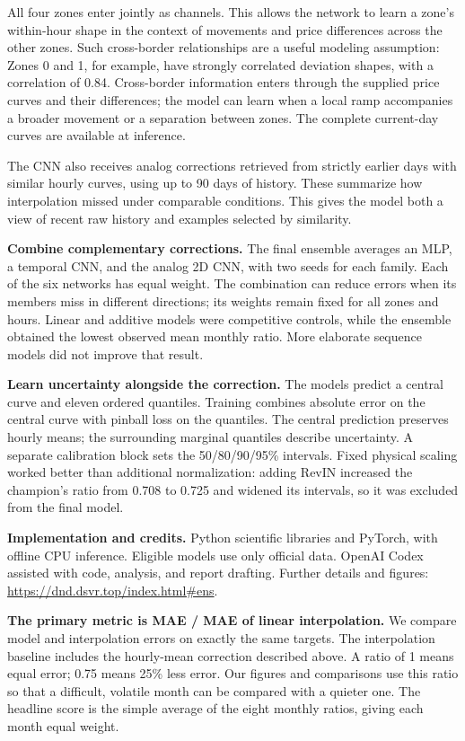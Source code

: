 \documentclass[11pt,a4paper]{article}
\newcommand{\reportsection}[2]{\vspace{5pt}{\large\bfseries\color{ink}#1\enspace #2}\par\vspace{2pt}}
\newcommand{\runin}[1]{\textbf{#1}\enspace}
\begin{document}
All four zones enter jointly as channels. This allows the network to learn
a zone's within-hour shape in the context of movements and price differences
across the other zones. Such cross-border relationships are a useful modeling
assumption: Zones 0 and 1, for example, have strongly correlated deviation
shapes, with a correlation of 0.84. Cross-border information enters through
the supplied price curves and their differences; the model can learn when
a local ramp accompanies a broader movement or a separation between zones.
The complete current-day curves are available at inference.

The CNN also receives analog corrections retrieved from strictly earlier
days with similar hourly curves, using up to 90 days of history. These summarize
how interpolation missed under comparable conditions. This gives the model
both a view of recent raw history and examples selected by similarity.

\runin{Combine complementary corrections.}
The final ensemble averages an MLP, a temporal CNN, and the analog 2D CNN,
with two seeds for each family. Each of the six networks has equal weight.
The combination can reduce errors when its members miss in different directions;
its weights remain fixed for all zones and hours. Linear and additive models
were competitive controls, while the ensemble obtained the lowest observed
mean monthly ratio. More elaborate sequence models did not improve that result.

\runin{Learn uncertainty alongside the correction.}
The models predict a central curve and eleven ordered quantiles. Training
combines absolute error on the central curve with pinball loss on the quantiles.
The central prediction preserves hourly means; the surrounding marginal
quantiles describe uncertainty. A separate calibration block sets the
50/80/90/95\% intervals. Fixed physical scaling worked better than additional
normalization: adding RevIN increased the champion's ratio from 0.708 to
0.725 and widened its intervals, so it was excluded from the final model.

{\footnotesize\color{muted}\runin{Implementation and credits.}
Python scientific libraries and PyTorch, with offline CPU inference. Eligible
models use only official data. OpenAI Codex assisted with code, analysis,
and report drafting. Further details and figures:
\url{https://dnd.dsvr.top/index.html#ens}.}

\newpage
\reportsection{2}{Results and validation assumptions}

\runin{The primary metric is MAE / MAE of linear interpolation.}
We compare model and interpolation errors on exactly the same targets.
The interpolation baseline includes the hourly-mean correction described
above. A ratio of 1 means equal error; 0.75 means 25\% less error.
Our figures and comparisons use this ratio so that a difficult, volatile
month can be compared with a quieter one. The headline score is the simple
average of the eight monthly ratios, giving each month equal weight.
\end{document}
